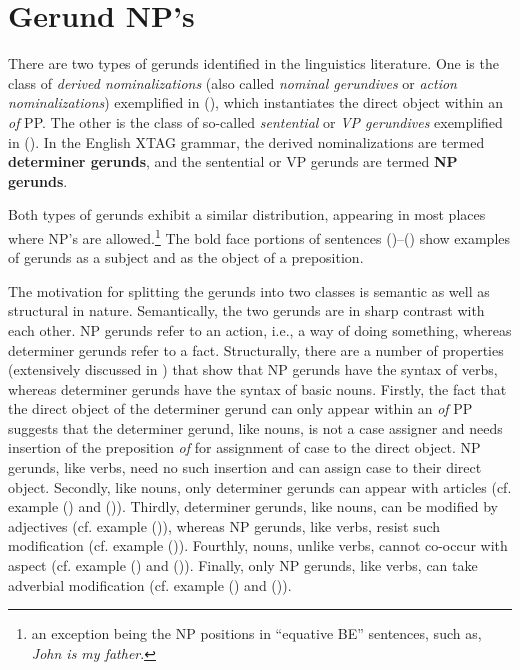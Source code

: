 \chapter{Gerund NP's}
\label{gerunds-chapter}

There are two types of gerunds identified in the linguistics
literature. One is the class of {\it derived nominalizations} (also 
called {\it nominal gerundives} or {\it action nominalizations}) 
exemplified in (), which instantiates the direct object within an
{\it of} PP.
The other is the class of so-called {\it sentential} or
{\it VP gerundives} exemplified in (). In the English XTAG grammar,
the derived nominalizations are termed {\bf determiner gerunds}, and the
sentential or VP gerunds are termed {\bf NP gerunds}.



Both types of gerunds exhibit a similar distribution, appearing in most
places where NP's are allowed.\footnote{an exception being the NP positions
in ``equative BE'' sentences, such as, {\it John is my father}.}  The bold
face portions of sentences ()--() show examples of gerunds as a
subject and as the object of a preposition.


The motivation for splitting the gerunds into two classes is semantic as
well as structural in nature. Semantically, the two gerunds are in sharp
contrast with each other. NP gerunds refer to an action, i.e., a way of
doing something, whereas determiner gerunds refer to a fact. Structurally,
there are a number of properties (extensively discussed in \cite{Lees60})
that show that NP gerunds have the syntax of verbs, whereas determiner
gerunds have the syntax of basic nouns.  Firstly, the fact that the direct
object of the determiner gerund can only appear within an {\it of} PP
suggests that the determiner gerund, like nouns, is not a case assigner and
needs insertion of the preposition {\it of} for assignment of case to the
direct object. NP gerunds, like verbs, need no such insertion and can
assign case to their direct object.  Secondly, like nouns, only determiner
gerunds can appear with articles (cf. example () and
()). Thirdly, determiner gerunds, like nouns, can be modified by
adjectives (cf. example ()), whereas NP gerunds, like verbs, resist
such modification (cf. example ()). Fourthly, nouns, unlike verbs,
cannot co-occur with aspect (cf. example () and ()). Finally,
only NP gerunds, like verbs, can take adverbial modification (cf. example
() and ()).

